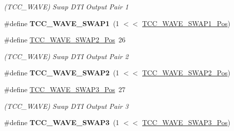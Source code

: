 \begin{DoxyCompactItemize}
\begin{DoxyCompactList}\small\item\em (T\+C\+C\+\_\+\+W\+A\+V\+E) Swap D\+T\+I Output Pair 1 \end{DoxyCompactList}\item 
\hypertarget{group___s_a_m_l21___t_c_c_gaff47145ff8147b963195112a0ebcb7e1}{}\#define {\bfseries T\+C\+C\+\_\+\+W\+A\+V\+E\+\_\+\+S\+W\+A\+P1}~(1 $<$$<$ \hyperlink{group___s_a_m_l21___t_c_c_ga52680b439e3fd1847338fc5044f4f38f}{T\+C\+C\+\_\+\+W\+A\+V\+E\+\_\+\+S\+W\+A\+P1\+\_\+\+Pos})\label{group___s_a_m_l21___t_c_c_gaff47145ff8147b963195112a0ebcb7e1}

\item 
\hypertarget{group___s_a_m_l21___t_c_c_ga2bf842aa838ad1bdf7fd724328e2a679}{}\#define \hyperlink{group___s_a_m_l21___t_c_c_ga2bf842aa838ad1bdf7fd724328e2a679}{T\+C\+C\+\_\+\+W\+A\+V\+E\+\_\+\+S\+W\+A\+P2\+\_\+\+Pos}~26\label{group___s_a_m_l21___t_c_c_ga2bf842aa838ad1bdf7fd724328e2a679}

\begin{DoxyCompactList}\small\item\em (T\+C\+C\+\_\+\+W\+A\+V\+E) Swap D\+T\+I Output Pair 2 \end{DoxyCompactList}\item 
\hypertarget{group___s_a_m_l21___t_c_c_ga29a8a3f0be8bd89bacc38e6527639884}{}\#define {\bfseries T\+C\+C\+\_\+\+W\+A\+V\+E\+\_\+\+S\+W\+A\+P2}~(1 $<$$<$ \hyperlink{group___s_a_m_l21___t_c_c_ga2bf842aa838ad1bdf7fd724328e2a679}{T\+C\+C\+\_\+\+W\+A\+V\+E\+\_\+\+S\+W\+A\+P2\+\_\+\+Pos})\label{group___s_a_m_l21___t_c_c_ga29a8a3f0be8bd89bacc38e6527639884}

\item 
\hypertarget{group___s_a_m_l21___t_c_c_ga462fa8f783a84cdcc746cabc9b2a98d8}{}\#define \hyperlink{group___s_a_m_l21___t_c_c_ga462fa8f783a84cdcc746cabc9b2a98d8}{T\+C\+C\+\_\+\+W\+A\+V\+E\+\_\+\+S\+W\+A\+P3\+\_\+\+Pos}~27\label{group___s_a_m_l21___t_c_c_ga462fa8f783a84cdcc746cabc9b2a98d8}

\begin{DoxyCompactList}\small\item\em (T\+C\+C\+\_\+\+W\+A\+V\+E) Swap D\+T\+I Output Pair 3 \end{DoxyCompactList}\item 
\hypertarget{group___s_a_m_l21___t_c_c_gad8f3939aeb9e66259226b556e4c4d92d}{}\#define {\bfseries T\+C\+C\+\_\+\+W\+A\+V\+E\+\_\+\+S\+W\+A\+P3}~(1 $<$$<$ \hyperlink{group___s_a_m_l21___t_c_c_ga462fa8f783a84cdcc746cabc9b2a98d8}{T\+C\+C\+\_\+\+W\+A\+V\+E\+\_\+\+S\+W\+A\+P3\+\_\+\+Pos})\label{group___s_a_m_l21___t_c_c_gad8f3939aeb9e66259226b556e4c4d92d}


\end{DoxyCompactItemize}
